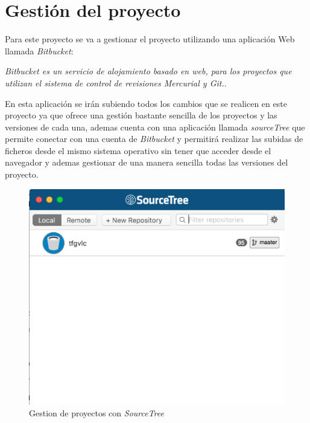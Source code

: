 \section{Gestión del proyecto}

Para este proyecto se va a gestionar el proyecto utilizando una aplicación Web llamada \textit{Bitbucket}:

\textit{Bitbucket es un servicio de alojamiento basado en web, para los proyectos que utilizan el sistema de control de revisiones Mercurial y Git.}\cite{bitbucket}.

En esta aplicación se irán subiendo todos los cambios que se realicen en este proyecto ya que ofrece una gestión bastante sencilla de los proyectos y las versiones de cada una, ademas cuenta con una aplicación llamada \textit{sourceTree} que permite conectar con una cuenta de \textit{Bitbucket} y permitirá realizar las subidas de ficheros desde el mismo sistema operativo sin tener que acceder desde el navegador y ademas gestionar de una manera sencilla todas las versiones del proyecto.

\begin{figure}[!h]
	\centering
	\includegraphics[width=0.3\linewidth]{figuras/stree}
	\caption{Gestion de proyectos con \textit{SourceTree}}
	\label{fig:stree}
\end{figure}
